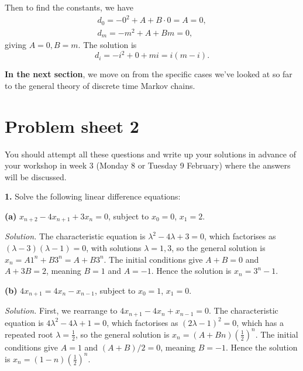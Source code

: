 \documentclass[
  a4paper,
]{article}
\newif\ifcomm\commtrue
\theoremstyle{definition}
\theoremstyle{definition}
\theoremstyle{definition}
\theoremstyle{remark}
\begin{document}
Then to find the constants, we have
\begin{gather*} d_0 = -0^2 + A + B\cdot0 = A = 0, \\
                  d_m = -m^2 + A + Bm = 0 , \end{gather*}
giving \(A = 0, B = m\). The solution is
\[ d_i = -i^2 + 0 + mi = i(m-i) .\]

\textbf{In the next section}, we move on from the specific cases we've looked at so far to the general theory of discrete time Markov chains.

\hypertarget{P02}{%
\section*{Problem sheet 2}\label{P02}}

\commtrue

You should attempt all these questions and write up your solutions in advance of your workshop in week 3 (Monday 8 or Tuesday 9 February) where the answers will be discussed.

\textbf{1.} Solve the following linear difference equations:

\textbf{(a)} \(x_{n+2} - 4x_{n+1} + 3x_{n} = 0\), subject to \(x_0 = 0\), \(x_1 = 2\).

\begin{myanswers}
\emph{Solution.} The characteristic equation is \(\lambda^2 - 4\lambda + 3 = 0\), which factorises as \((\lambda - 3)(\lambda - 1) = 0\), with solutions \(\lambda = 1,3\), so the general solution is \(x_n = A1^n + B3^n = A + B3^n\). The initial conditions give \(A+B = 0\) and \(A + 3B = 2\), meaning \(B = 1\) and \(A = -1\). Hence the solution is \(x_n = 3^n - 1\).

\end{myanswers}

\textbf{(b)} \(4x_{n+1} = 4x_n - x_{n-1}\), subject to \(x_0 = 1\), \(x_1 = 0\).

\begin{myanswers}
\emph{Solution.} First, we rearrange to \(4x_{n+1} - 4x_n + x_{n-1} = 0\). The characteristic equation is \(4\lambda^2 - 4\lambda + 1 = 0\), which factorises as \((2\lambda - 1)^2 = 0\), which has a repeated root \(\lambda = \frac12\), so the general solution is \(x_n = (A + Bn)(\frac12)^n\). The initial conditions give \(A=1\) and \((A + B)/2 = 0\), meaning \(B = -1\). Hence the solution is \(x_n = (1 - n)(\frac12)^n\).

\end{myanswers}
\end{document}

